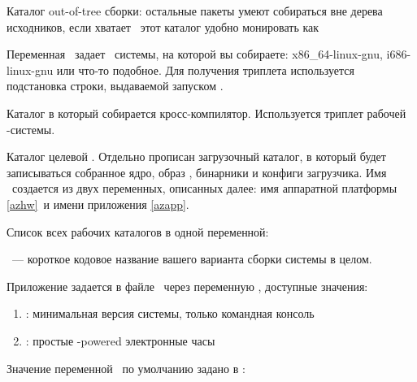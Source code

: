 Каталог out-of-tree сборки: остальные пакеты умеют собираться вне дерева
исходников, если хватает \ram\ этот каталог удобно монировать как 


Переменная \ задает \ системы, на которой вы
собираете: x86\_64-linux-gnu, i686-linux-gnu или что-то подобное. Для получения
триплета используется подстановка строки, выдаваемой запуском .


Каталог в который собирается кросс-компилятор. Используется триплет
рабочей \linux-системы.


Каталог целевой . Отдельно прописан загрузочный каталог, в который
будет записываться собранное ядро, образ , бинарники и конфиги
загрузчика. Имя \ создается из двух переменных, описанных далее: имя
аппаратной платформы \ref{azhw}\ и имени приложения
\ref{azapp}.


Список всех рабочих каталогов в одной переменной:


 \label{azgz}


\label{azapp}

\ --- короткое кодовое название вашего варианта сборки системы
в целом.

Приложение задается в файле \ через
переменную , доступные значения:

\begin{enumerate}
  \item {}: минимальная версия системы, только командная консоль
  \item {}: простые \linux-powered электронные часы
\end{enumerate}

Значение переменной \ по умолчанию задано в :

